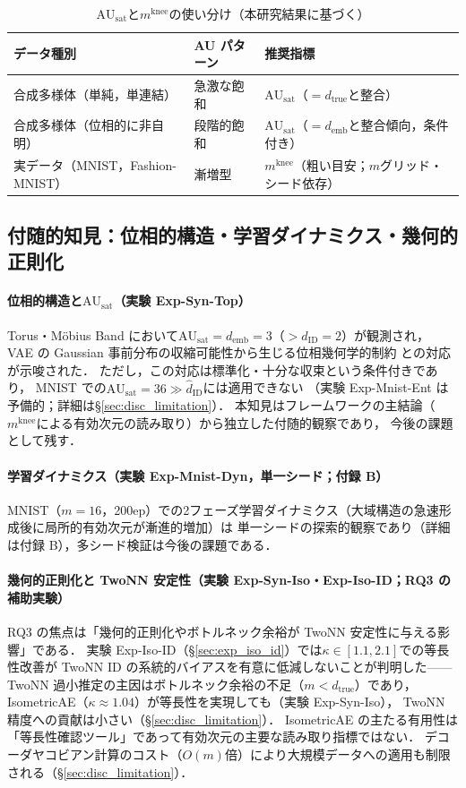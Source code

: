 \documentclass[11pt,a4paper]{jsarticle}
\newcommand{\dID}{d_{\mathrm{ID}}}
\newcommand{\dtrue}{d_{\mathrm{true}}}
\newcommand{\kap}{\kappa}
\newcommand{\AUsat}{\mathrm{AU}_{\mathrm{sat}}}
\newcommand{\mknee}{m^{\mathrm{knee}}}
\newcommand{\demb}{d_{\mathrm{emb}}}
\begin{document}
\begin{table}[H]
\centering
\caption{$\AUsat$と$\mknee$の使い分け（本研究結果に基づく）}
\label{tab:au_comparison}
\small
\begin{tabular}{lll}
\toprule
データ種別 & AU パターン & 推奨指標 \\
\midrule
合成多様体（単純，単連結） & 急激な飽和 & $\AUsat$（$= \dtrue$と整合） \\
合成多様体（位相的に非自明） & 段階的飽和 & $\AUsat$（$= \demb$と整合傾向，条件付き） \\
実データ（MNIST，Fashion-MNIST） & 漸増型 & $\mknee$（粗い目安；$m$グリッド・シード依存） \\
\bottomrule
\end{tabular}
\end{table}

\subsection{付随的知見：位相的構造・学習ダイナミクス・幾何的正則化}\label{sec:disc_incidental}

\paragraph{位相的構造と$\AUsat$（実験 Exp-Syn-Top）}
Torus・Möbius Band において$\AUsat = \demb = 3$（$> \dID = 2$）が観測され，
VAE の Gaussian 事前分布の収縮可能性から生じる位相幾何学的制約
\cite{hatcher2002algebraic,guillemin1974differential}との対応が示唆された．
ただし，この対応は標準化・十分な収束という条件付きであり，
MNIST での$\AUsat = 36 \gg \hat{d}_\mathrm{ID}$には適用できない
（実験 Exp-Mnist-Ent は予備的；詳細は§\ref{sec:disc_limitation}）．
本知見はフレームワークの主結論（$\mknee$による有効次元の読み取り）から独立した付随的観察であり，
今後の課題として残す．

\paragraph{学習ダイナミクス（実験 Exp-Mnist-Dyn，単一シード；付録 B）}
MNIST（$m=16$，200ep）での2フェーズ学習ダイナミクス（大域構造の急速形成後に局所的有効次元が漸進的増加）は
単一シードの探索的観察であり（詳細は付録 B），多シード検証は今後の課題である．

\paragraph{幾何的正則化と TwoNN 安定性（実験 Exp-Syn-Iso・Exp-Iso-ID；RQ3 の補助実験）}
RQ3 の焦点は「幾何的正則化やボトルネック余裕が TwoNN 安定性に与える影響」である．
実験 Exp-Iso-ID（§\ref{sec:exp_iso_id}）では$\kap \in [1.1, 2.1]$での等長性改善が
TwoNN ID の系統的バイアスを有意に低減しないことが判明した——
TwoNN 過小推定の主因はボトルネック余裕の不足（$m < d_\mathrm{true}$）であり，
IsometricAE（$\kap \approx 1.04$）が等長性を実現しても（実験 Exp-Syn-Iso），
TwoNN 精度への貢献は小さい（§\ref{sec:disc_limitation}）．
IsometricAE の主たる有用性は「等長性確認ツール」であって有効次元の主要な読み取り指標ではない．
デコーダヤコビアン計算のコスト（$O(m)$倍）により大規模データへの適用も制限される（§\ref{sec:disc_limitation}）．
\end{document}
